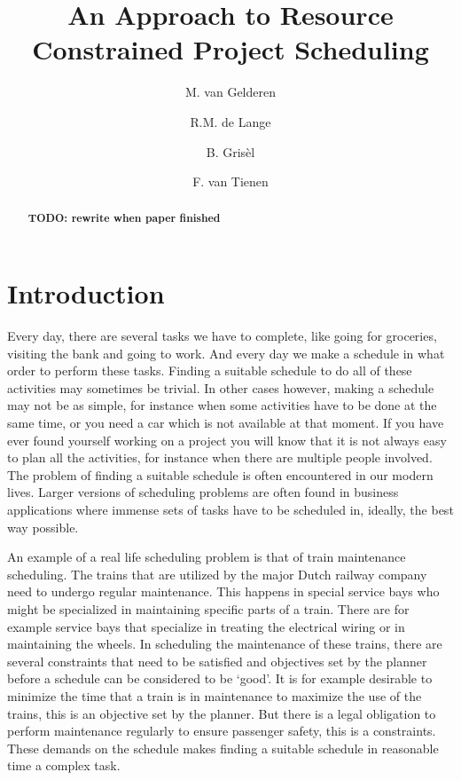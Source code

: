 \documentclass{article}
\title{An Approach to Resource Constrained Project Scheduling}
\author{M. van Gelderen  \and
    R.M. de Lange \and
    B. Gris\`el \and
    F. van Tienen}
\date{}
\theoremstyle{definition}
\newcommand{\TODO}[1]{{\color{red}\textbf{TODO: #1}}}
\begin{document}
\maketitle
\thispagestyle{empty}

\begin{abstract}
\TODO{rewrite when paper finished}
\end{abstract}


\newpage


\section{Introduction}

Every day, there are several tasks we have to complete, like going for groceries, visiting the bank and going to work.
And every day we make a schedule in what order to perform these tasks.
Finding a suitable schedule to do all of these activities may sometimes be trivial. 
In other cases however, making a schedule may not be as simple, for instance when some activities have to be done at the same time, or you need a car which is not available at that moment. 
If you have ever found yourself working on a project you will know that it is not always easy to plan all the activities, for instance when there are multiple people involved. 
The problem of finding a suitable schedule is often encountered in our modern lives.
Larger versions of scheduling problems are often found in business applications where immense sets of tasks have to be scheduled in, ideally, the best way possible.

An example of a real life scheduling problem is that of train maintenance scheduling. 
The trains that are utilized by the major Dutch railway company need to undergo regular maintenance. 
This happens in special service bays who might be specialized in maintaining specific parts of a train. 
There are for example service bays that specialize in treating the electrical wiring or in maintaining the wheels.
In scheduling the maintenance of these trains, there are several constraints that need to be satisfied and objectives set by the planner before a schedule can be considered to be `good'. 
It is for example desirable to minimize the time that a train is in maintenance to maximize the use of the trains, this is an objective set by the planner.
But there is a legal obligation to perform maintenance regularly to ensure passenger safety, this is a constraints. 
These demands on the schedule makes finding a suitable schedule in reasonable time a complex task. 
\end{document}
